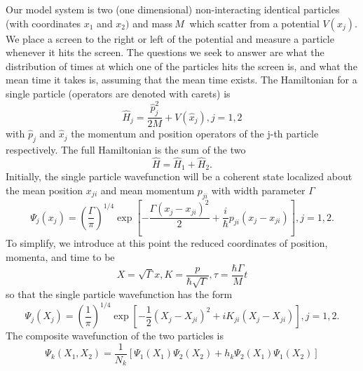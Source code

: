 \documentclass[preprint,aps]{revtex4}
\begin{document}
Our model system is two (one dimensional) non-interacting 
identical particles (with coordinates $x_{1}$ and $x_{2})$ and mass$\ M\ $%
which scatter from a potential $V\left( x_{j}\right)$. We place a screen
to the right or left of the potential and measure a particle whenever it
hits the screen. The questions we seek to answer are what the
distribution of times at which one of the particles hits the screen is, and what
the mean time it takes is, assuming that the mean time exists. The
Hamiltonian for a single particle (operators are denoted with carets) is
\begin{equation}
\hat{H}_{j}=\frac{\hat{p}_{j}^{2}}{2M}+V\left( \hat{x}_{j}\right) ,j=1,2
\label{2.1}
\end{equation}%
with $\hat{p}_{j}$ and $\hat{x}_{j}$ the momentum and position operators of
the j-th particle respectively. The full Hamiltonian is the sum of the two%
\begin{equation}
\hat{H}=\hat{H}_{1}+\hat{H}_{2}.  \label{2.2}
\end{equation}%
Initially, the single particle wavefunction will be a coherent state
localized about the mean position $x_{ji}$ and mean momentum $p_{ji}$ with
width parameter $\Gamma$%
\begin{equation}
\Psi _{j}\left( x_{j}\right) =\left( \frac{\Gamma }{\pi }\right) ^{1/4}\exp %
\left[ -\frac{\Gamma \left( x_{j}-x_{ji}\right) ^{2}}{2}+\frac{i}{\hbar }%
p_{ji}\left( x_{j}-x_{ji}\right) \right] ,j=1,2.  \label{2.3}
\end{equation}%
To simplify, we introduce at this point the reduced coordinates of position, momenta, and time to be%
\begin{equation}
X=\sqrt{\Gamma }x,K=\frac{p}{\hbar \sqrt{\Gamma }},\tau =\frac{\hbar \Gamma
}{M}t  \label{2.4}
\end{equation}%
so that the single particle wavefunction has the form%
\begin{equation}
\Psi _{j}\left( X_{j}\right) =\left( \frac{1}{\pi }\right) ^{1/4}\exp \left[
-\frac{1}{2}\left( X_{j}-X_{ji}\right) ^{2}+iK_{ji}\left( X_{j}-X_{ji}\right) %
\right] ,j=1,2.  \label{2.5}
\end{equation}%
The composite wavefunction of the two particles is
\begin{equation}
\Psi _{k}\left( X_{1},X_{2}\right) =\frac{1}{N_{k}}\left[ \Psi _{1}\left(
X_{1}\right) \Psi _{2}\left( X_{2}\right) +h_{k}\Psi _{2}\left( X_{1}\right)
\Psi _{1}\left( X_{2}\right) \right]  \label{2.6}
\end{equation}%
\end{document}
